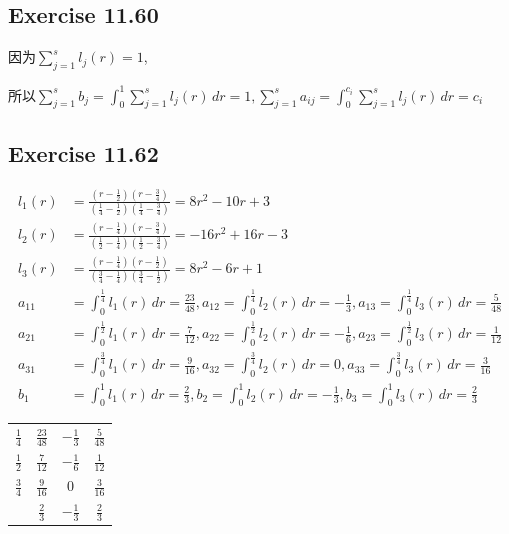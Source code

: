 \documentclass[UTF8]{ctexart}
\begin{document}
\subsection*{Exercise 11.60}
因为$\sum_{j=1}^{s}l_j(r) = 1$,

所以$\sum_{j=1}^{s}b_j = \int_{0}^{1} \sum_{j=1}^{s} l_j(r) \,dr  = 1, 
\sum_{j=1}^{s} a_{ij} = \int_{0}^{c_i} \sum_{j=1}^{s} l_j(r) \,dr = c_i$

\subsection*{Exercise 11.62}
\begin{align*}
    l_1(r) &= \frac{(r-\frac{1}{2})(r-\frac{3}{4})}{(\frac{1}{4}-\frac{1}{2})(\frac{1}{4}-\frac{3}{4})} = 8r^2 - 10r + 3 \\
    l_2(r) &= \frac{(r-\frac{1}{4})(r-\frac{3}{4})}{(\frac{1}{2}-\frac{1}{4})(\frac{1}{2}-\frac{3}{4})} = -16r^2 + 16r - 3 \\
    l_3(r) &= \frac{(r-\frac{1}{4})(r-\frac{1}{2})}{(\frac{3}{4}-\frac{1}{4})(\frac{3}{4}-\frac{1}{2})} = 8r^2 - 6r + 1 \\
    a_{11} &= \int_{0}^{\frac{1}{4}} l_1(r) \,dr = \frac{23}{48}, 
    a_{12} = \int_{0}^{\frac{1}{4}} l_2(r) \,dr = -\frac{1}{3}, 
    a_{13} = \int_{0}^{\frac{1}{4}} l_3(r) \,dr = \frac{5}{48} \\
    a_{21} &= \int_{0}^{\frac{1}{2}} l_1(r) \,dr = \frac{7}{12},
    a_{22} = \int_{0}^{\frac{1}{2}} l_2(r) \,dr = -\frac{1}{6},
    a_{23} = \int_{0}^{\frac{1}{2}} l_3(r) \,dr = \frac{1}{12} \\
    a_{31} &= \int_{0}^{\frac{3}{4}} l_1(r) \,dr = \frac{9}{16},
    a_{32} = \int_{0}^{\frac{3}{4}} l_2(r) \,dr = 0,
    a_{33} = \int_{0}^{\frac{3}{4}} l_3(r) \,dr = \frac{3}{16} \\
    b_1 &= \int_{0}^{1} l_1(r) \,dr = \frac{2}{3},
    b_2 = \int_{0}^{1} l_2(r) \,dr = -\frac{1}{3},
    b_3 = \int_{0}^{1} l_3(r) \,dr = \frac{2}{3}
\end{align*}

\begin{table}[H]
    \centering
    \begin{tabular}{c|ccc}
        $\frac{1}{4}$ & $\frac{23}{48}$ & $-\frac{1}{3}$ & $\frac{5}{48}$ \\
        $\frac{1}{2}$ & $\frac{7}{12}$ & $-\frac{1}{6}$ & $\frac{1}{12}$ \\
        $\frac{3}{4}$ & $\frac{9}{16}$ & 0 & $\frac{3}{16}$ \\
        \hline
                    &$\frac{2}{3}$ & $-\frac{1}{3}$ & $\frac{2}{3}$
    \end{tabular}
\end{table}
\end{document}
